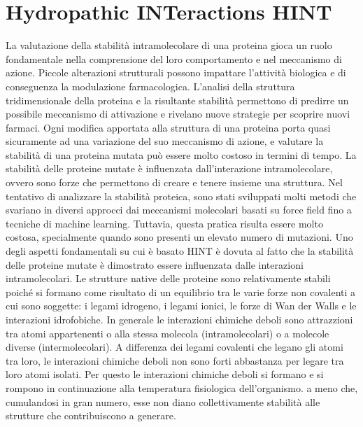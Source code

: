 \section{Hydropathic INTeractions HINT}\label{sec:cap_sec_subsec}
La valutazione della stabilità intramolecolare di una proteina gioca un ruolo fondamentale nella comprensione del loro comportamento e nel meccanismo di azione. Piccole alterazioni strutturali possono impattare l'attività biologica e di conseguenza la modulazione farmacologica. 
L'analisi della struttura tridimensionale della proteina e la risultante stabilità permettono di predirre un possibile meccanismo di attivazione e rivelano nuove strategie per scoprire nuovi farmaci. Ogni modifica apportata alla struttura di una proteina porta quasi sicuramente ad una variazione del suo meccanismo di azione, e valutare la stabilità di una proteina mutata può essere molto costoso in termini di tempo.
La stabilità delle proteine mutate è influenzata dall'interazione intramolecolare, ovvero sono forze che permettono di creare e tenere insieme una struttura. Nel tentativo di analizzare la stabilità proteica, sono stati sviluppati molti metodi che svariano in diversi approcci dai meccanismi molecolari basati su force field fino a tecniche di machine learning. Tuttavia, questa pratica risulta essere molto costosa, specialmente quando sono presenti un elevato numero di mutazioni. Uno degli aspetti fondamentali su cui è basato HINT è dovuta al fatto che la stabilità delle proteine mutate è dimostrato essere influenzata dalle interazioni intramolecolari. Le strutture native delle proteine sono relativamente stabili poiché si formano come risultato di un equilibrio tra le varie forze non covalenti a cui sono soggette: i legami idrogeno, i legami ionici, le forze di Wan der Walls e le interazioni idrofobiche. In generale le interazioni chimiche deboli sono attrazzioni tra atomi appartenenti o alla stessa molecola (intramolecolari) o a molecole diverse (intermolecolari). A differenza dei legami covalenti che legano gli atomi tra loro, le interazioni chimiche deboli non sono forti abbastanza per legare tra loro atomi isolati. Per questo le interazioni chimiche deboli si formano e si rompono in continuazione alla temperatura fisiologica dell'organismo. a meno che, cumulandosi in gran numero, esse non diano collettivamente stabilità alle strutture che contribuiscono a generare.


